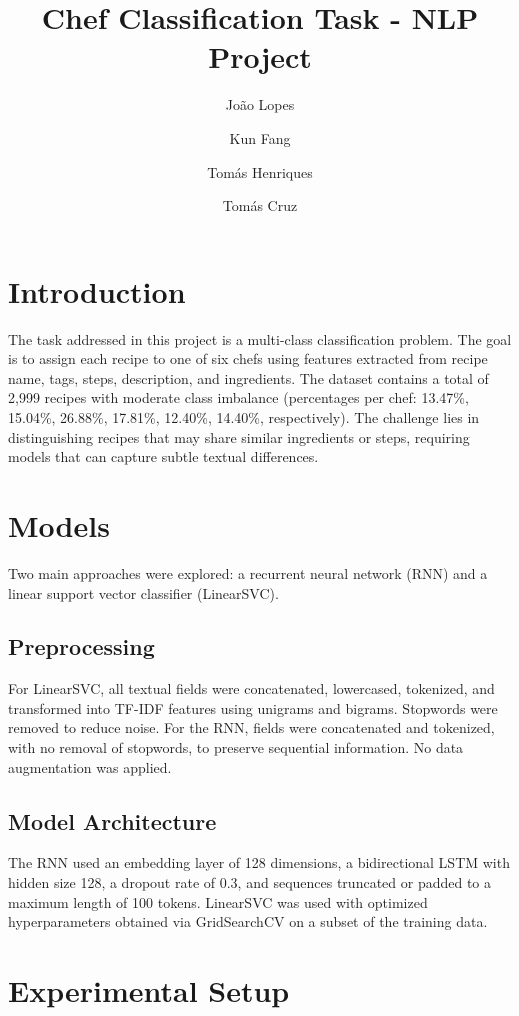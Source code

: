 \documentclass[twocolumn,10pt]{article}
\title{Chef Classification Task - NLP Project}
\author{João Lopes}
\author{Kun Fang}
\author{Tomás Henriques}
\author{Tomás Cruz}
\affil{Group 64\\ Instituto Superior Técnico, Universidade de Lisboa}
\begin{document}
\maketitle

\section{Introduction}

The task addressed in this project is a multi-class classification problem. The goal is to assign each recipe to one of six chefs using features extracted from recipe name, tags, steps, description, and ingredients. The dataset contains a total of 2,999 recipes with moderate class imbalance (percentages per chef: 13.47\%, 15.04\%, 26.88\%, 17.81\%, 12.40\%, 14.40\%, respectively). The challenge lies in distinguishing recipes that may share similar ingredients or steps, requiring models that can capture subtle textual differences.  

\section{Models}

Two main approaches were explored: a recurrent neural network (RNN) and a linear support vector classifier (LinearSVC).  

\subsection{Preprocessing}
For LinearSVC, all textual fields were concatenated, lowercased, tokenized, and transformed into TF-IDF features using unigrams and bigrams. Stopwords were removed to reduce noise. For the RNN, fields were concatenated and tokenized, with no removal of stopwords, to preserve sequential information. No data augmentation was applied.  

\subsection{Model Architecture}
The RNN used an embedding layer of 128 dimensions, a bidirectional LSTM with hidden size 128, a dropout rate of 0.3, and sequences truncated or padded to a maximum length of 100 tokens. LinearSVC was used with optimized hyperparameters obtained via GridSearchCV on a subset of the training data.  

\section{Experimental Setup}
\end{document}
